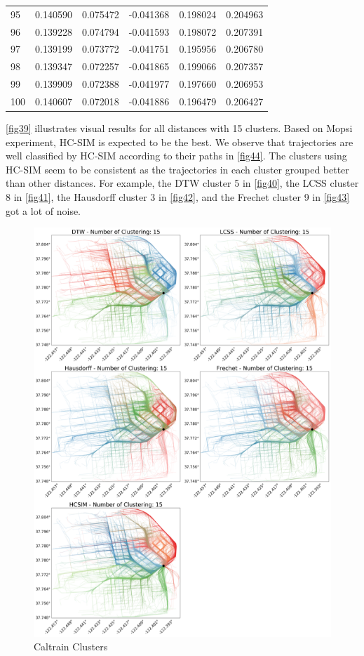 \documentclass[a4paper, 12pt]{article}
\begin{document}
\begin{tabularx}{\linewidth}{|X|X|X|X|X|X|}
    95 & 0.140590 & 0.075472 & -0.041368 & 0.198024 & 0.204963 \\
    96 & 0.139228 & 0.074794 & -0.041593 & 0.198072 & 0.207391 \\
    97 & 0.139199 & 0.073772 & -0.041751 & 0.195956 & 0.206780 \\
    98 & 0.139347 & 0.072257 & -0.041865 & 0.199066 & 0.207357 \\
    99 & 0.139909 & 0.072388 & -0.041977 & 0.197660 & 0.206953 \\
    100 & 0.140607 & 0.072018 & -0.041886 & 0.196479 & 0.206427 
    \label{table:caltrain_silhouette}
\end{tabularx}

\autoref{fig39} illustrates visual results for all distances with 15 clusters. Based on Mopsi experiment, HC-SIM is expected to be the best. We observe that trajectories are well classified by HC-SIM according to their paths in \ref{fig44}. The clusters using HC-SIM seem to be consistent as the trajectories in each cluster grouped better than other distances. For example, the DTW cluster 5 in \autoref{fig40}, the LCSS cluster 8 in \autoref{fig41}, the Hausdorff cluster 3 in \autoref{fig42}, and the Frechet cluster 9 in \autoref{fig43} got a lot of noise.

\begin{figure}[htbp!]
    \centering
    \includegraphics[width=1\textwidth]{Caltrain Plots.png}
    \caption{Caltrain Clusters}
    \label{fig39}
\end{figure}
\end{document}
